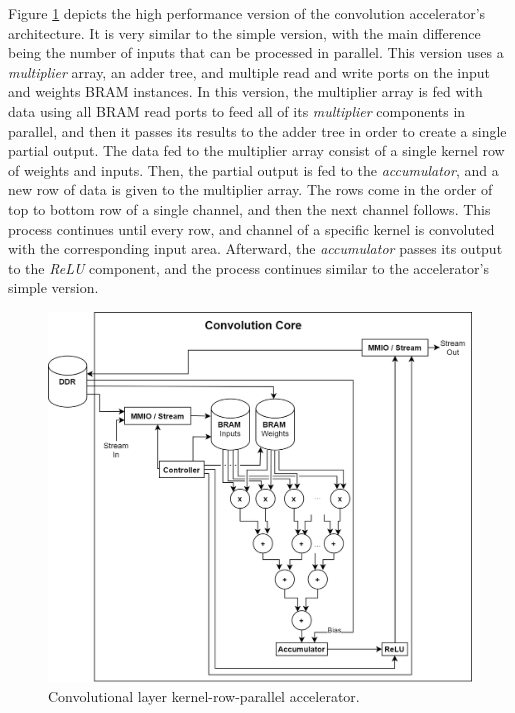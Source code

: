 Figure \ref{fig:conv-core-row-parallel} depicts the high performance version of the convolution accelerator's architecture. It is very similar to the simple version, with the main difference being the number of inputs that can be processed in parallel. This version uses a \emph{multiplier} array, an adder tree, and multiple read and write ports on the input and weights BRAM instances. In this version, the multiplier array is fed with data using all BRAM read ports to feed all of its \emph{multiplier} components in parallel, and then it passes its results to the adder tree in order to create a single partial output. The data fed to the multiplier array consist of a single kernel row of weights and inputs. Then, the partial output is fed to the \emph{accumulator}, and a new row of data is given to the multiplier array. The rows come in the order of top to bottom row of a single channel, and then the next channel follows. This process continues until every row, and channel of a specific kernel is convoluted with the corresponding input area. Afterward, the \emph{accumulator} passes its output to the \emph{ReLU} component, and the process continues similar to the accelerator's simple version.

\begin{figure} [H]
	\centering
	\includegraphics[width=\textwidth]{../Images/Platform/Conv_core_row_parallel.png}
	\decoRule
	\caption[Convolutional layer kernel-row-parallel accelerator]{Convolutional layer kernel-row-parallel accelerator.}
	\label{fig:conv-core-row-parallel}
\end{figure}

